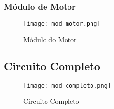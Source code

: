 \subsubsection{Módulo de Motor}

\begin{figure}[htbp]
	\centering
		\texttt{[image: mod\_motor.png]}
	\caption{Módulo do Motor}
	\label{mod_motor}
\end{figure}

 
\subsection{Circuito Completo}

\begin{figure}[htbp]
	\centering
		\texttt{[image: mod\_completo.png]}
	\caption{Circuito Completo}
	\label{mod_completo}
\end{figure}
